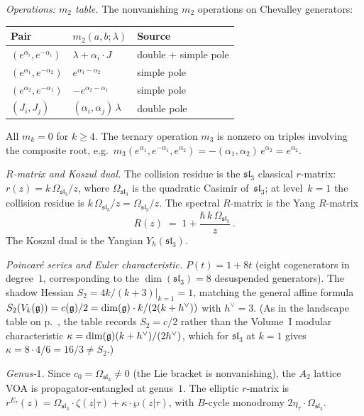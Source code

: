 \begin{computation}
\smallskip
\noindent
\emph{Operations: $m_2$ table.}
The nonvanishing $m_2$ operations on Chevalley generators:
\begin{center}
\small
\renewcommand{\arraystretch}{1.3}
\begin{tabular}{lll}
\toprule
\textbf{Pair} & $m_2(a,b;\lambda)$ & \textbf{Source} \\
\midrule
$(e^{\alpha_i}, e^{-\alpha_i})$ & $\lambda + \alpha_i \cdot J$
 & double + simple pole \\
$(e^{\alpha_1}, e^{-\alpha_2})$ & $e^{\alpha_1-\alpha_2}$
 & simple pole \\
$(e^{\alpha_2}, e^{-\alpha_1})$ & $-e^{\alpha_2-\alpha_1}$
 & simple pole \\
$(J_i, J_j)$ & $(\alpha_i,\alpha_j)\,\lambda$
 & double pole \\
\bottomrule
\end{tabular}
\end{center}
All $m_k = 0$ for $k \ge 4$. The ternary operation $m_3$ is
nonzero on triples involving the composite root, e.g.\
$m_3(e^{\alpha_1}, e^{-\alpha_1}, e^{\alpha_2})
= -(\alpha_1,\alpha_2)\,e^{\alpha_2} = e^{\alpha_2}$.

\smallskip
\noindent
\emph{$R$-matrix and Koszul dual.}
The collision residue is the $\mathfrak{sl}_3$ classical
$r$-matrix:
$r(z) = k\,\Omega_{\mathfrak{sl}_3}/z$,
where $\Omega_{\mathfrak{sl}_3}$ is the quadratic Casimir
of~$\mathfrak{sl}_3$; at level~$k=1$ the collision residue is
$k\,\Omega_{\mathfrak{sl}_3}/z=\Omega_{\mathfrak{sl}_3}/z$. The spectral $R$-matrix is
the Yang $R$-matrix
\begin{equation}\label{eq:A2-lattice-R}
R(z) \;=\; 1 + \frac{\hbar\,k\,\Omega_{\mathfrak{sl}_3}}{z}\,.
\end{equation}
The Koszul dual is the Yangian
$Y_\hbar(\mathfrak{sl}_3)$.

\smallskip
\noindent
\emph{Poincar\'{e} series and Euler characteristic.}
$P(t) = 1 + 8t$ (eight cogenerators in degree~$1$,
corresponding to the $\dim(\mathfrak{sl}_3) = 8$
desuspended generators). The shadow Hessian
$S_2 = 4k/(k+3)\big|_{k=1} = 1$, matching the
general affine formula
$S_2(V_k(\mathfrak{g})) = c(\mathfrak{g})/2 = \dim(\mathfrak{g}) \cdot k/(2(k+h^\vee))$
with $h^\vee = 3$. (As in the landscape table on
p.~\pageref{comp:e1-ordered-bar-landscape}, the table records
$S_2 = c/2$ rather than the Volume~I modular characteristic
$\kappa = \dim(\mathfrak{g})(k+h^\vee)/(2h^\vee)$, which for
$\mathfrak{sl}_3$ at $k = 1$ gives
$\kappa = 8 \cdot 4/6 = 16/3 \ne S_2$.)

\smallskip
\noindent
\emph{Genus-$1$.}
Since $c_0 = \Omega_{\mathfrak{sl}_3} \ne 0$ (the
Lie bracket is nonvanishing), the $A_2$ lattice VOA is
propagator-entangled at genus~$1$. The elliptic $r$-matrix is
$r^{E_\tau}(z) = \Omega_{\mathfrak{sl}_3}\cdot\zeta(z|\tau)
+ \kappa\cdot\wp(z|\tau)$,
with $B$-cycle monodromy $2\eta_\tau\cdot\Omega_{\mathfrak{sl}_3}$.
\end{computation}

